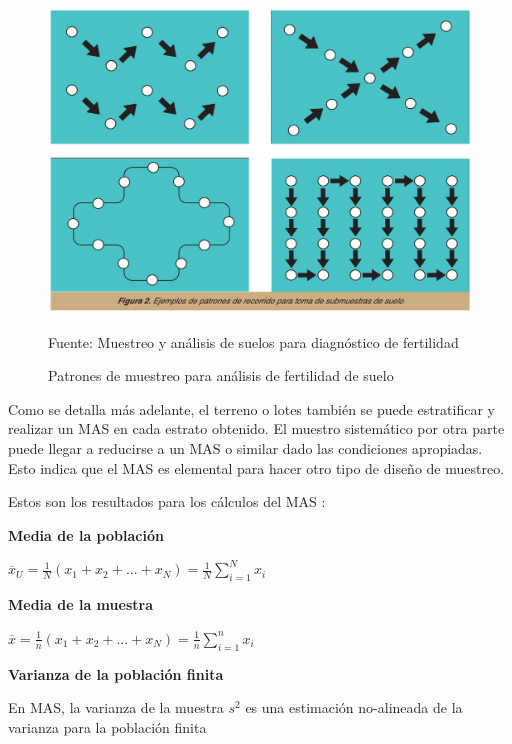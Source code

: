 \documentclass{report}
\begin{document}
\begin{figure}[H]
    \centering
    \includegraphics[width=0.3\paperwidth]{ref/sampling-patterns-srs.png}
    \caption{Patrones de muestreo para análisis de fertilidad de suelo}
    Fuente: Muestreo y análisis de suelos para diagnóstico de fertilidad \cite{lassaga-2011}
\end{figure}

Como se detalla más adelante, el terreno o lotes también se puede estratificar y realizar un MAS en cada estrato obtenido. El muestro sistemático por otra parte puede llegar a reducirse a un MAS o similar dado las condiciones apropiadas. Esto indica que el MAS es elemental para hacer otro tipo de diseño de muestreo.

\bigbreak

Estos son los resultados para los cálculos del MAS \cite{thompson-2012}:

\bigbreak
\textbf{Media de la población}

\bigbreak

$\overline{x}_U = \frac{1}{N}(x_1 + x_2 + ... + x_N) = \frac{1}{N} \sum \limits_{i=1}^N x_i$


\bigbreak
\textbf{Media de la muestra}

\bigbreak

$\overline{x} = \frac{1}{n}(x_1 + x_2 + ... + x_N) = \frac{1}{n} \sum \limits_{i=1}^n x_i$

\bigbreak

\textbf{Varianza de la población finita}

\bigbreak

En MAS, la varianza de la muestra $s^2$ es una estimación no-alineada de la varianza para la población finita
\end{document}
